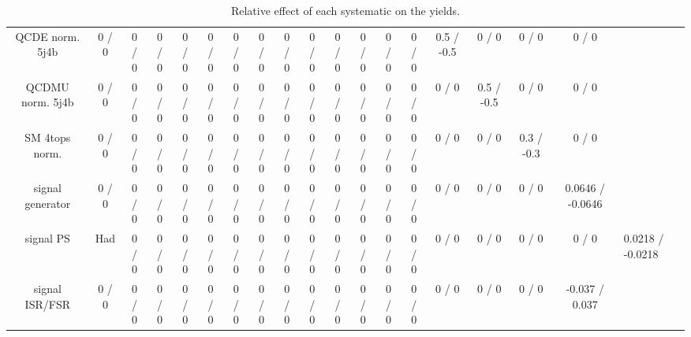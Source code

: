 \documentclass[10pt]{article}
\begin{document}
\begin{table}[htbp]
\begin{center}
\begin{tabular}{|c|c|c|c|c|c|c|c|c|c|c|c|c|c|c|c|c|c|}
  QCDE norm. 5j4b & 0 / 0 & 0 / 0 & 0 / 0 & 0 / 0 & 0 / 0 & 0 / 0 & 0 / 0 & 0 / 0 & 0 / 0 & 0 / 0 & 0 / 0 & 0 / 0 & 0 / 0 & 0.5 / -0.5 & 0 / 0 & 0 / 0 & 0 / 0 \\ 
  QCDMU norm. 5j4b & 0 / 0 & 0 / 0 & 0 / 0 & 0 / 0 & 0 / 0 & 0 / 0 & 0 / 0 & 0 / 0 & 0 / 0 & 0 / 0 & 0 / 0 & 0 / 0 & 0 / 0 & 0 / 0 & 0.5 / -0.5 & 0 / 0 & 0 / 0 \\ 
  SM 4tops norm. & 0 / 0 & 0 / 0 & 0 / 0 & 0 / 0 & 0 / 0 & 0 / 0 & 0 / 0 & 0 / 0 & 0 / 0 & 0 / 0 & 0 / 0 & 0 / 0 & 0 / 0 & 0 / 0 & 0 / 0 & 0.3 / -0.3 & 0 / 0 \\ 
  signal generator & 0 / 0 & 0 / 0 & 0 / 0 & 0 / 0 & 0 / 0 & 0 / 0 & 0 / 0 & 0 / 0 & 0 / 0 & 0 / 0 & 0 / 0 & 0 / 0 & 0 / 0 & 0 / 0 & 0 / 0 & 0 / 0 & 0.0646 / -0.0646 \\ 
  signal PS & Had & 0 / 0 & 0 / 0 & 0 / 0 & 0 / 0 & 0 / 0 & 0 / 0 & 0 / 0 & 0 / 0 & 0 / 0 & 0 / 0 & 0 / 0 & 0 / 0 & 0 / 0 & 0 / 0 & 0 / 0 & 0 / 0 & 0.0218 / -0.0218 \\ 
  signal ISR/FSR & 0 / 0 & 0 / 0 & 0 / 0 & 0 / 0 & 0 / 0 & 0 / 0 & 0 / 0 & 0 / 0 & 0 / 0 & 0 / 0 & 0 / 0 & 0 / 0 & 0 / 0 & 0 / 0 & 0 / 0 & 0 / 0 & -0.037 / 0.037 \\ 
\hline 
\end{tabular} 
\caption{Relative effect of each systematic on the yields.} 
\end{center} 
\end{table} 
\end{document}
